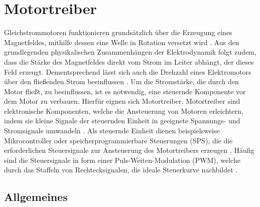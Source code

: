 %
%

\chapter{Motortreiber}
Gleichstrommotoren funktionieren grundsätzlich über die Erzeugung eines Magnetfeldes, mithilfe dessen eine Welle in Rotation versetzt wird \cite{Roddeck:2023}.
Aus den grundlegenden physikalischen Zusammenhängen der Elektrodynamik folgt zudem, dass die Stärke des Magnetfeldes direkt vom Strom im Leiter abhängt, der dieses Feld erzeugt.
Dementsprechend lässt sich auch die Drehzahl eines Elektromotors über den fließenden Strom beeinflussen \cite{Feynman:2020}.
Um die Stromstärke, die durch den Motor fließt, zu beeinflussen, ist es notwendig, eine steuernde Komponente vor dem Motor zu verbauen. Hierfür eignen sich Motortreiber. Motortreiber sind elektronische Komponenten, welche die Ansteuerung von Motoren erleichtern, indem sie kleine Signale der steuernden Einheit in geeignete Spannungs- und Stromsignale umwandeln \cite{Roddeck:2023}. Als steuernde Einheit dienen beispielsweise Mikrocontroller oder speicherprogrammierbare Steuerungen (SPS), die die erforderlichen Steuersignale zur Ansteuerung des Motortreibers erzeugen \cite{Bartlett:2023a}. Häufig sind die Steuersignale in form einer Puls-Weiten-Modulation (PWM), welche durch das Staffeln von Rechtecksignalen, die ideale Steuerkurve nachbildet \cite{Bartlett:2023a}. 


\section{Allgemeines}


